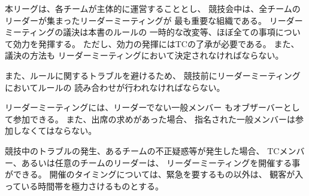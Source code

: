\documentclass[a4j]{jarticle}
\begin{document}
本リーグは、各チームが主体的に運営することとし、
競技会中は、全チームのリーダーが集まったリーダーミーティングが
最も重要な組織である。
リーダーミーティングの議決は本書のルールの
一時的な改変等、ほぼ全ての事項について効力を発揮する。
ただし、効力の発揮にはTCの了承が必要である。
また、議決の方法も
リーダーミーティングにおいて決定されなければならない。

また、ルールに関するトラブルを避けるため、
競技前にリーダーミーティングにおいてルールの
読み合わせが行われなければならない。


リーダーミーティングには、リーダーでない一般メンバー
もオブザーバーとして参加できる。
また、出席の求めがあった場合、
指名された一般メンバーは参加しなくてはならない。


競技中のトラブルの発生、あるチームの不正疑惑等が発生した場合、
TCメンバー、あるいは任意のチームのリーダーは、
リーダーミーティングを開催する事ができる。
開催のタイミングについては、緊急を要するもの以外は、
観客が入っている時間帯を極力さけるものとする。


%
\end{document}

